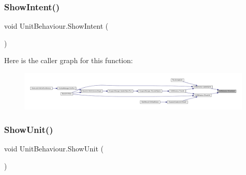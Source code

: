 \mbox{\label{class_unit_behaviour_a0cf70610b8aef46ef592819496ac7950}} 
\subsubsection{\texorpdfstring{ShowIntent()}{ShowIntent()}}
{\footnotesize\ttfamily void Unit\+Behaviour.\+Show\+Intent (\begin{DoxyParamCaption}{ }\end{DoxyParamCaption})}

Here is the caller graph for this function\+:\nopagebreak
\begin{figure}[H]
\begin{center}
\leavevmode
\includegraphics[width=350pt]{class_unit_behaviour_a0cf70610b8aef46ef592819496ac7950_icgraph}
\end{center}
\end{figure}
\mbox{\label{class_unit_behaviour_a41b8d7f5a98e21449eafe21a31707b1d}} 
\subsubsection{\texorpdfstring{ShowUnit()}{ShowUnit()}}
{\footnotesize\ttfamily void Unit\+Behaviour.\+Show\+Unit (\begin{DoxyParamCaption}{ }\end{DoxyParamCaption})}

